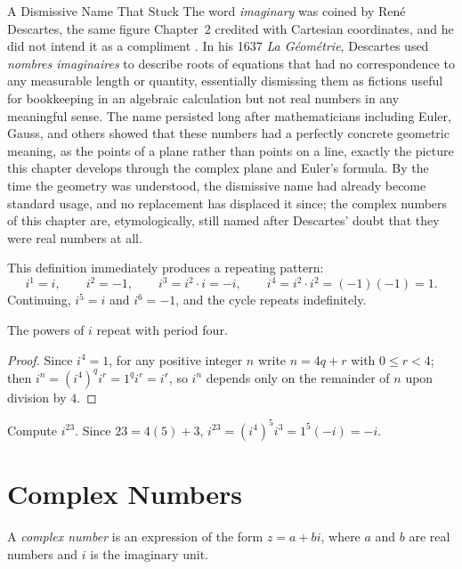 \begin{historicalnote}{A Dismissive Name That Stuck}
The word \emph{imaginary} was coined by Ren\'e Descartes, the same figure
Chapter~2 credited with Cartesian coordinates, and he did not intend it
as a compliment \cite{boyer1991}. In his 1637 \emph{La G\'eom\'etrie},
Descartes used \emph{nombres imaginaires} to describe roots of equations
that had no correspondence to any measurable length or quantity,
essentially dismissing them as fictions useful for bookkeeping in an
algebraic calculation but not real numbers in any meaningful sense. The
name persisted long after mathematicians including Euler, Gauss, and
others showed that these numbers had a perfectly concrete geometric
meaning, as the points of a plane rather than points on a line, exactly
the picture this chapter develops through the complex plane and Euler's
formula. By the time the geometry was understood, the dismissive name
had already become standard usage, and no replacement has displaced it
since; the complex numbers of this chapter are, etymologically, still
named after Descartes' doubt that they were real numbers at all.
\end{historicalnote}

This definition immediately produces a repeating pattern:
\[
i^1 = i, \qquad i^2 = -1, \qquad i^3 = i^2\cdot i = -i, \qquad i^4 =
i^2\cdot i^2 = (-1)(-1) = 1.
\]
Continuing, $i^5 = i$ and $i^6 = -1$, and the cycle repeats indefinitely.

\begin{theorem}
The powers of $i$ repeat with period four.
\end{theorem}

\begin{proof}
Since $i^4 = 1$, for any positive integer $n$ write $n = 4q+r$ with $0
\le r < 4$; then $i^n = (i^4)^q i^r = 1^q i^r = i^r$, so $i^n$ depends
only on the remainder of $n$ upon division by $4$.
\end{proof}

\begin{example}
Compute $i^{23}$. Since $23 = 4(5)+3$, $i^{23} = (i^4)^5 i^3 = 1^5(-i) =
-i$.
\end{example}

\section{Complex Numbers}

\begin{definition}
A \emph{complex number} is an expression of the form $z = a+bi$, where
$a$ and $b$ are real numbers and $i$ is the imaginary unit.
\end{definition}


